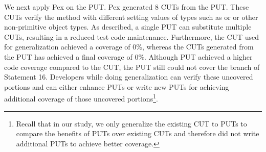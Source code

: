 We next apply Pex on the  PUT. Pex generated $8$ CUTs from the  PUT. These CUTs verify the  method with different setting values of types such as  or  or other non-primitive object types. As described, a single PUT can substitute multiple CUTs, resulting in a reduced test code maintenance. Furthermore, the CUT used for generalization achieved a coverage of $0$\%, whereas the CUTs generated from the PUT has achieved a final coverage of $0$\%. Although PUT achieved a higher code coverage compared to the CUT, the PUT still could not cover the  branch of Statement 16. Developers while doing generalization can verify these uncovered portions and can either enhance PUTs or write new PUTs for achieving additional coverage of those uncovered portions\footnote{Recall that in our study, we only generalize the existing CUT to PUTs to compare the benefits of PUTs over existing CUTs and therefore did not write additional PUTs to achieve better coverage.}. 

